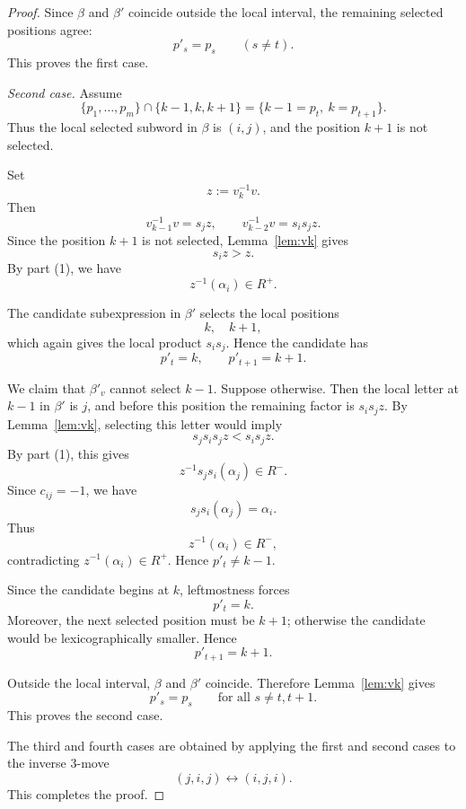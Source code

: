 \documentclass[12pt, reqno]{amsart}
\theoremstyle{plain}
\theoremstyle{definition}
\numberwithin{equation}{section}
\begin{document}
\begin{proof}
Since \(\beta\) and \(\beta'\) coincide outside the local interval, the
remaining selected positions agree:
\[
p'_s=p_s\qquad(s\neq t).
\]
This proves the first case.

\medskip
\noindent
\emph{Second case.}
Assume
\[
\{p_1,\dots,p_m\}\cap\{k-1,k,k+1\}
=
\{k-1=p_t,\ k=p_{t+1}\}.
\]
Thus the local selected subword in \(\beta\) is \((i,j)\), and the position
\(k+1\) is not selected.

Set
\[
z:=v_k^{-1}v.
\]
Then
\[
v_{k-1}^{-1}v=s_jz,
\qquad
v_{k-2}^{-1}v=s_is_jz.
\]
Since the position \(k+1\) is not selected, Lemma~\ref{lem:vk} gives
\[
s_iz>z.
\]
By part (1), we have
\[
z^{-1}(\alpha_i)\in R^+.
\]

The candidate subexpression in \(\beta'\) selects the local positions
\[
k,\quad k+1,
\]
which again gives the local product \(s_is_j\). Hence the candidate has
\[
p'_t=k,\qquad p'_{t+1}=k+1.
\]

We claim that \(\beta'_v\) cannot select \(k-1\). Suppose otherwise. Then the
local letter at \(k-1\) in \(\beta'\) is \(j\), and before this position the
remaining factor is \(s_is_jz\). By Lemma~\ref{lem:vk}, selecting this letter
would imply
\[
s_js_is_jz<s_is_jz.
\]
By part (1), this gives
\[
z^{-1}s_js_i(\alpha_j)\in R^-.
\]
Since \(c_{ij}=-1\), we have
\[
s_js_i(\alpha_j)=\alpha_i.
\]
Thus
\[
z^{-1}(\alpha_i)\in R^-,
\]
contradicting \(z^{-1}(\alpha_i)\in R^+\). Hence \(p'_t\neq k-1\).

Since the candidate begins at \(k\), leftmostness forces
\[
p'_t=k.
\]
Moreover, the next selected position must be \(k+1\); otherwise the candidate
would be lexicographically smaller. Hence
\[
p'_{t+1}=k+1.
\]

Outside the local interval, \(\beta\) and \(\beta'\) coincide. Therefore
Lemma~\ref{lem:vk} gives
\[
p'_s=p_s
\qquad
\text{for all }s\neq t,t+1.
\]
This proves the second case.

The third and fourth cases are obtained by applying the first and second cases
to the inverse \(3\)-move
\[
(j,i,j)\longleftrightarrow(i,j,i).
\]
This completes the proof.
\end{proof}
\end{document}
